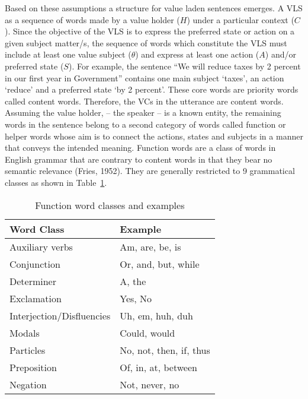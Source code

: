 Based on these assumptions a structure for value laden sentences emerges. A VLS as a sequence of words made by a value holder ($H$) under a particular context ($C$). Since the objective of the VLS is to express the preferred state or action on a given subject matter/s, the sequence of words which constitute the VLS must include at least one value subject ($\theta$) and express at least one action ($A$) and/or preferred state ($S$). For example, the sentence ``We will reduce taxes by 2 percent in our first year in Government'' contains one main subject `taxes', an action `reduce' and a preferred state `by 2 percent'. These core words are priority words called content words. Therefore, the VCs in the utterance are content words. Assuming the value holder, -- the speaker -- is a known entity, the remaining words in the sentence belong to a second category of words called function or helper words whose aim is to connect the actions, states and subjects in a manner that conveys the intended meaning. Function words are a class of words in English grammar that are contrary to content words in that they bear no semantic relevance (Fries, 1952). They are generally restricted to 9 grammatical classes as shown in Table~\ref{tab:one}. 

\begin{table}%
\caption{Function word classes and examples}
\label{tab:one}
\begin{minipage}{\columnwidth}
\begin{center}
\begin{tabular}{ll}
  \toprule
  Word Class   &  Example\\
  \toprule
  Auxiliary verbs     & Am, are, be, is\\
  Conjunction  & Or, and, but, while\\
  Determiner     & A, the\\
  Exclamation    & Yes, No\\
  Interjection/Disfluencies   & Uh, em, huh, duh\\
  Modals       & Could, would\\
  Particles     & No, not, then, if, thus\\
  Preposition & Of, in, at, between\\
  Negation     & Not, never, no\\
  \bottomrule
\end{tabular}
\end{center}
\bigskip\centering

\end{minipage}
\end{table}%

